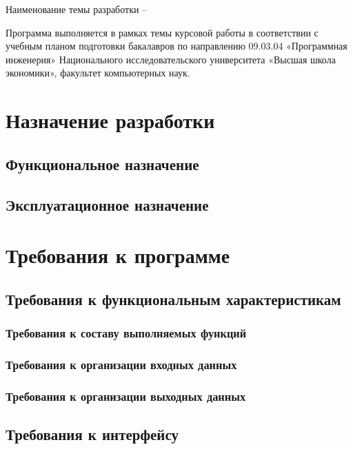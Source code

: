 \documentclass[a4paper,12pt,reqno]{article}
\begin{document}
	Наименование темы разработки – {\color{red}{TODO}}

 Программа выполняется в рамках темы курсовой работы в соответствии с учебным планом подготовки бакалавров по направлению 09.03.04 «Программная инженерия» Национального исследовательского университета «Высшая школа экономики», факультет компьютерных наук.
	
	\newpage 
	\section{Назначение разработки}
	 
	\subsection{Функциональное назначение}
	{\color{red}{TODO}}
	\subsection{Эксплуатационное назначение}
	{\color{red}{TODO}}
	
						\newpage
	\section{Требования к программе}
	\subsection{Требования к функциональным характеристикам}
	\subsubsection{Требования к составу выполняемых функций}
	
	{\color{red}{TODO}}
	\subsubsection{Требования к организации входных данных}
	{\color{red}{TODO}}
	\subsubsection{Требования к организации выходных данных}
	{\color{red}{TODO}}
	\clearpage
	\subsection{Требования к интерфейсу}
	{\color{red}{TODO}}
\end{document}
